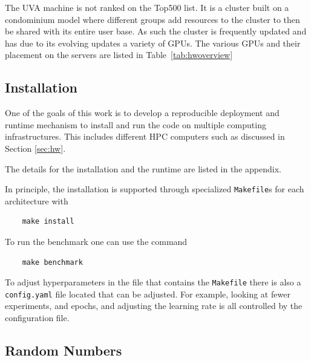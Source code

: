 \documentclass[sigplan,screen]{acmart}
\begin{document}
The UVA machine is not ranked on the Top500 list. It is a cluster built on a condominium model where different groups add resources to the cluster to then be shared with its entire user base. As such the cluster is frequently updated and has due to its evolving updates a variety of GPUs. The various GPUs and their placement on the servers are listed in Table~\ref{tab:hwoverview}




\subsection{Installation}

One of the goals of this work is to develop a reproducible deployment and runtime mechanism to install and run the code on multiple computing infrastructures. This includes different HPC computers such as discussed in Section \ref{sec:hw}.

The details for the installation and the runtime are listed in the appendix.



In principle, the installation is supported through specialized \verb|Makefile|s for each architecture with 

\begin{verbatim}
    make install
\end{verbatim}

To run the benchmark one can use the command

\begin{verbatim}
    make benchmark
\end{verbatim}

To adjust hyperparameters in the file that contains the \verb|Makefile| there is also a \verb|config.yaml| file located that can be adjusted. For example, looking at fewer experiments, and epochs, and adjusting the learning rate is all controlled by the configuration file.


\subsection{Random Numbers}
\end{document}
